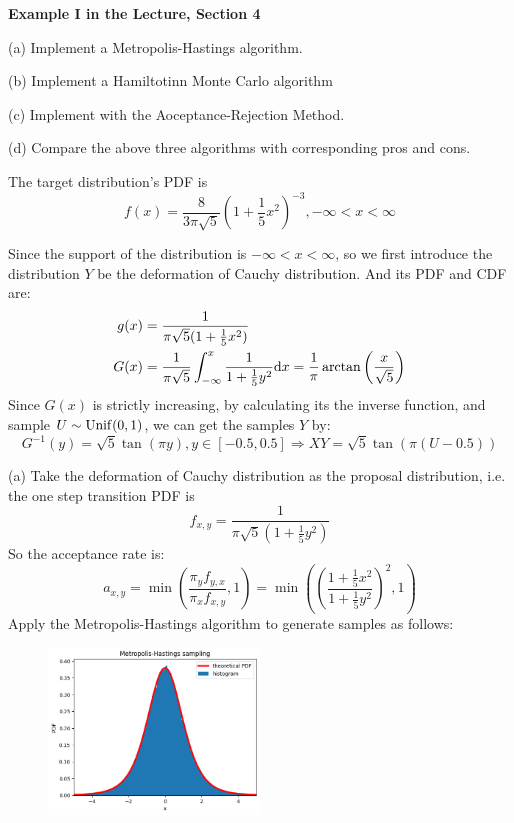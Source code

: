 \begin{homeworkProblem}

\textbf{Example I in the Lecture, Section 4}

(a) Implement a Metropolis-Hastings algorithm.

(b) Implement a Hamiltotinn Monte Carlo algorithm

(c) Implement with the Aoceptance-Rejection Method.

(d) Compare the above three algorithms with corresponding pros and cons.

\solution

The target distribution's PDF is
$$f(x)=\dfrac{8}{3\pi\sqrt{5}}\left(1+\dfrac{1}{5}x^2\right)^{-3}, -\infty<x<\infty$$

Since the support of the distribution is $-\infty<x<\infty$, so we first introduce the distribution $Y$ be the deformation of Cauchy distribution. And its PDF and CDF are:
\begin{align*}
g(x) &= \dfrac{1}{\pi\sqrt{5}(1+\frac{1}{5}x^2)} \\
G(x) &= \dfrac{1}{\pi\sqrt{5}}\int_{-\infty}^{x}\dfrac{1}{1+\frac{1}{5}y^2}\mathrm{d}x=\dfrac{1}{\pi}\arctan\left(\dfrac{x}{\sqrt{5}}\right)
\end{align*}
Since $G(x)$ is strictly increasing, by calculating its the inverse function, and sample $U\sim\operatorname{Unif}(0,1)$, we can get the samples $Y$ by:
$$G^{-1}(y) = \sqrt{5}\tan(\pi y), y\in[-0.5,0.5] \Rightarrow XY = \sqrt{5}\tan(\pi (U-0.5))$$

(a) Take the deformation of Cauchy distribution as the proposal distribution, i.e. the one step transition PDF is
$$f_{x,y} = \dfrac{1}{\pi\sqrt{5}(1+\frac{1}{5}y^2)}$$
So the acceptance rate is:
$$a_{x,y}=\min\left(\dfrac{\pi_yf_{y,x}}{\pi_xf_{x,y}},1\right)=\min\left(\left(\dfrac{1+\frac{1}{5}x^2}{1+\frac{1}{5}y^2}\right)^2,1\right)$$
Apply the Metropolis-Hastings algorithm to generate samples as follows:
\begin{figure}[h]
    \centering
    \includegraphics[width=0.5\textwidth]{./figure/p10/MH.png}
\end{figure}


\end{homeworkProblem}
